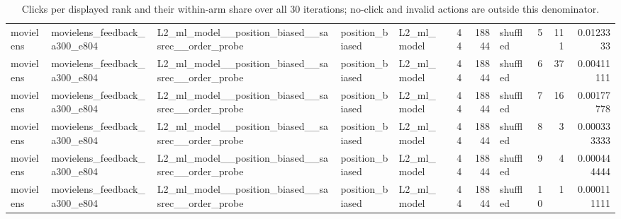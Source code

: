 \begin{table}[htbp!]
\begin{tabular}{lllllrrlrrr}
movielens & movielens\_feedback\_a300\_e804 & L2\_ml\_model\_\_position\_biased\_\_sasrec\_\_order\_probe & position\_biased & L2\_ml\_model & 44 & 18844 & shuffled & 5 & 111 & 0.0123333 \\
movielens & movielens\_feedback\_a300\_e804 & L2\_ml\_model\_\_position\_biased\_\_sasrec\_\_order\_probe & position\_biased & L2\_ml\_model & 44 & 18844 & shuffled & 6 & 37 & 0.00411111 \\
movielens & movielens\_feedback\_a300\_e804 & L2\_ml\_model\_\_position\_biased\_\_sasrec\_\_order\_probe & position\_biased & L2\_ml\_model & 44 & 18844 & shuffled & 7 & 16 & 0.00177778 \\
movielens & movielens\_feedback\_a300\_e804 & L2\_ml\_model\_\_position\_biased\_\_sasrec\_\_order\_probe & position\_biased & L2\_ml\_model & 44 & 18844 & shuffled & 8 & 3 & 0.000333333 \\
movielens & movielens\_feedback\_a300\_e804 & L2\_ml\_model\_\_position\_biased\_\_sasrec\_\_order\_probe & position\_biased & L2\_ml\_model & 44 & 18844 & shuffled & 9 & 4 & 0.000444444 \\
movielens & movielens\_feedback\_a300\_e804 & L2\_ml\_model\_\_position\_biased\_\_sasrec\_\_order\_probe & position\_biased & L2\_ml\_model & 44 & 18844 & shuffled & 10 & 1 & 0.000111111 \\
\hline
\end{tabular}
\caption{Clicks per displayed rank and their within-arm share over all 30 iterations; no-click and invalid actions are outside this denominator.}
\label{chap:results:tab:rq2_rank_counts_l2}
\end{table}
